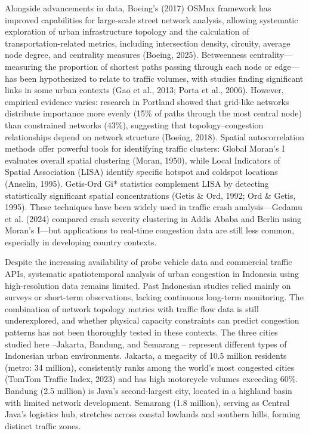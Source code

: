 \documentclass[12pt,a4paper]{article}
\begin{document}
Alongside advancements in data, Boeing’s (2017) OSMnx framework has improved capabilities for large-scale street network analysis, allowing systematic exploration of urban infrastructure topology and the calculation of transportation-related metrics, including intersection density, circuity, average node degree, and centrality measures (Boeing, 2025). Betweenness centrality—measuring the proportion of shortest paths passing through each node or edge—has been hypothesized to relate to traffic volumes, with studies finding significant links in some urban contexts (Gao et al., 2013; Porta et al., 2006). However, empirical evidence varies: research in Portland showed that grid-like networks distribute importance more evenly (15\% of paths through the most central node) than constrained networks (43\%), suggesting that topology–congestion relationships depend on network structure (Boeing, 2018). Spatial autocorrelation methods offer powerful tools for identifying traffic clusters: Global Moran’s I evaluates overall spatial clustering (Moran, 1950), while Local Indicators of Spatial Association (LISA) identify specific hotspot and coldspot locations (Anselin, 1995). Getis-Ord Gi* statistics complement LISA by detecting statistically significant spatial concentrations (Getis \& Ord, 1992; Ord \& Getis, 1995). These techniques have been widely used in traffic crash analysis—Gedamu et al. (2024) compared crash severity clustering in Addis Ababa and Berlin using Moran’s I—but applications to real-time congestion data are still less common, especially in developing country contexts.

Despite the increasing availability of probe vehicle data and commercial traffic APIs, systematic spatiotemporal analysis of urban congestion in Indonesia using high-resolution data remains limited. Past Indonesian studies relied mainly on surveys or short-term observations, lacking continuous long-term monitoring. The combination of network topology metrics with traffic flow data is still underexplored, and whether physical capacity constraints can predict congestion patterns has not been thoroughly tested in these contexts. The three cities studied here --Jakarta, Bandung, and Semarang -- represent different types of Indonesian urban environments. Jakarta, a megacity of 10.5 million residents (metro: 34 million), consistently ranks among the world’s most congested cities (TomTom Traffic Index, 2023) and has high motorcycle volumes exceeding 60\%. Bandung (2.5 million) is Java’s second-largest city, located in a highland basin with limited network development. Semarang (1.8 million), serving as Central Java’s logistics hub, stretches across coastal lowlands and southern hills, forming distinct traffic zones.
\end{document}

